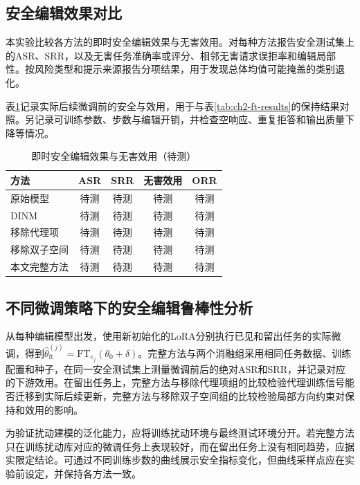 \subsection{安全编辑效果对比}

本实验比较各方法的即时安全编辑效果与无害效用。对每种方法报告安全测试集上的ASR、SRR，以及无害任务准确率或评分、相邻无害请求误拒率和编辑局部性。按风险类型和提示来源报告分项结果，用于发现总体均值可能掩盖的类别退化。

表\ref{tab:ch2-main-results}记录实际后续微调前的安全与效用，用于与表\ref{tab:ch2-ft-results}的保持结果对照。另记录可训练参数、步数与编辑开销，并检查空响应、重复拒答和输出质量下降等情况。

\begin{table}[htbp]
 \centering
 \caption{即时安全编辑效果与无害效用（待测）}
 \label{tab:ch2-main-results}
 \begin{tabular}{p{}cccc}
 \toprule
 方法 & ASR & SRR & 无害效用 & ORR\\ \midrule
 原始模型 & 待测 & 待测 & 待测 & 待测\\
 DINM & 待测 & 待测 & 待测 & 待测\\
 移除代理项 & 待测 & 待测 & 待测 & 待测\\
 移除双子空间 & 待测 & 待测 & 待测 & 待测\\
 本文完整方法 & 待测 & 待测 & 待测 & 待测\\
 \bottomrule
 \end{tabular}
\end{table}


\subsection{不同微调策略下的安全编辑鲁棒性分析}

从每种编辑模型出发，使用新初始化的LoRA分别执行已见和留出任务的实际微调，得到$\widehat{\theta}_{\mathrm{ft}}^{(j)}=\mathrm{FT}_{e_j}(\theta_0+\delta)$。完整方法与两个消融组采用相同任务数据、训练配置和种子，在同一安全测试集上测量微调前后的绝对ASR和SRR，并记录对应的下游效用。在留出任务上，完整方法与移除代理项组的比较检验代理训练信号能否迁移到实际后续更新，完整方法与移除双子空间组的比较检验局部方向约束对保持和效用的影响。

为验证扰动建模的泛化能力，应将训练扰动环境与最终测试环境分开。若完整方法只在训练扰动库对应的微调任务上表现较好，而在留出任务上没有相同趋势，应据实限定结论。可通过不同训练步数的曲线展示安全指标变化，但曲线采样点应在实验前设定，并保持各方法一致。

